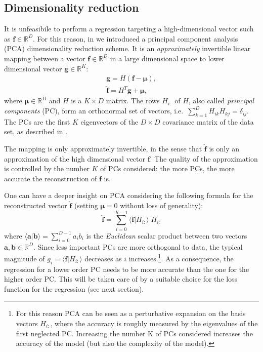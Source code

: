\documentclass[twocolumn,showpacs,preprintnumbers,nofootinbib,prd,
superscriptaddress,10pt]{revtex4-2}
\newcommand{\R}{\mathbb{R}}
\begin{document}
\subsection{Dimensionality reduction}
\label{sec:PCA}

It is unfeasibile to perform a regression targeting a high-dimensional vector such as $\boldsymbol{f} \in \R^D$. 
For this reason, in \cite{Schmidt:2020yuu} we introduced a principal component analysis (PCA) dimensionality 
reduction scheme.
It is an {\it approximately} invertible linear mapping between a vector $\boldsymbol{f} \in \R^D$ in a large dimensional space to lower dimensional vector  $\boldsymbol{g} \in \R^K$:
%
\begin{align}
	\mathbf{g} = H (\mathbf{f} - \boldsymbol{\mu}) \label{eq:PCA_reduction_model},\\
	\hat{\mathbf{f}} = H^T \mathbf{g} + \boldsymbol{\mu}, \label{eq:PCA_reconstruction_model}
\end{align}
where $\boldsymbol{\mu} \in \R^D$ and $H$ is a $K \times D$ matrix.
The rows $H_{i:}$ of $H$, also called {\it principal components} (PC), form an orthonormal set of vectors, 
i.e.~${\sum_{k=1}^D H_{ik} H_{kj} = \delta_{ij}}$.
The PCs are the first $K$ eigenvectors of the $D \times D$ covariance matrix of the data set, as described in 
\cite[Sec. 12]{murphy2012machine}.

The mapping is only approximately invertible, in the sense that $\hat{\mathbf{f}}$ is only an approximation of the high dimensional vector $\mathbf{f}$. The quality of the approximation is controlled by the number $K$ of PCs considered: the more PCs, the more accurate the reconstruction of $\mathbf{f}$ is.

One can have a deeper insight on PCA considering the following formula for the reconstructed vector $\hat{\mathbf{f}}$ (setting $\boldsymbol{\mu}=0$ without loss of generality):
\begin{equation} \label{eq:perturbative_exp}
	\hat{\mathbf{f}} = \sum_{i=0}^{K-1} \langle \mathbf{f} | H_{i:} \rangle \; H_{i:}
\end{equation}
%
where $\langle \mathbf{a} | \mathbf{b} \rangle = \sum_{i=0}^{D-1} a_i b_i$ is the {\it Euclidean} scalar product between two vectors $\mathbf{a}, \mathbf{b} \in \R^D$.
%
Since less important PCs are more orthogonal to data, the typical magnitude of $g_i = \langle \mathbf{f} | H_{i:} \rangle$ decreases as $i$ increases.\footnote{For this reason PCA can be seen as a perturbative expansion on the basis vectors $H_{i:}$, where the accuracy is roughly measured by the eigenvalues of the first neglected PC. Increasing the number K of PCs considered increases the accuracy of the model (but also the complexity of the model).}.
As a consequence, the regression for a lower order PC needs to be more accurate than the one for the higher order PC. This will be taken care of by a suitable choice for the loss function for the regression (see next section).
\end{document}
